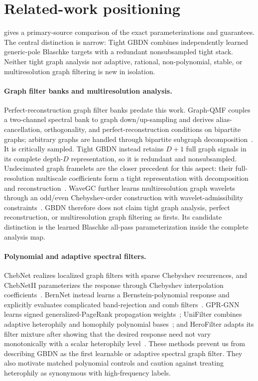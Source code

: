 \section{Related-work positioning}
\label{sec:related-work}

 gives a primary-source comparison of the exact
parameterizations and guarantees.  The central distinction is narrow: Tight
GBDN combines independently learned generic-pole Blaschke targets with a
redundant nonsubsampled tight stack.  Neither tight graph analysis nor adaptive,
rational, non-polynomial, stable, or multiresolution graph filtering is new in
isolation.

\paragraph{Graph filter banks and multiresolution analysis.}
Perfect-reconstruction graph filter banks predate this work. Graph-QMF couples a
two-channel spectral bank to graph down/up-sampling and derives alias-cancellation,
orthogonality, and perfect-reconstruction conditions on bipartite graphs; arbitrary
graphs are handled through bipartite subgraph decomposition~\cite{narang2012graphqmf}.
It is critically sampled. Tight GBDN instead retains $D+1$ full graph signals in its
complete depth-$D$ representation, so it is redundant and nonsubsampled. Undecimated
graph framelets are the closer precedent for this aspect: their full-resolution
multiscale coefficients form a tight representation with decomposition and
reconstruction~\cite{zheng2021framelets}. WaveGC further learns multiresolution graph
wavelets through an odd/even Chebyshev-order construction with wavelet-admissibility
constraints~\cite{liu2025wavegc}. GBDN therefore does not claim tight graph analysis,
perfect reconstruction, or multiresolution graph filtering as firsts. Its candidate
distinction is the learned Blaschke all-pass parameterization inside the complete
analysis map.

\paragraph{Polynomial and adaptive spectral filters.}
ChebNet realizes localized graph filters with sparse Chebyshev recurrences, and
ChebNetII parameterizes the response through Chebyshev interpolation
coefficients~\cite{defferrard2016chebnet,he2022chebnetii}. BernNet instead learns a
Bernstein-polynomial response and explicitly evaluates complicated band-rejection and
comb filters~\cite{he2021bernnet}. GPR-GNN learns signed generalized-PageRank
propagation weights~\cite{chien2021gprgnn}; UniFilter combines adaptive heterophily
and homophily polynomial bases~\cite{huang2024unifilter}; and HeroFilter adapts its
filter mixture after showing that the desired response need not vary monotonically
with a scalar heterophily level~\cite{zhang2025herofilter}. These methods prevent us
from describing GBDN as the first learnable or adaptive spectral graph filter. They
also motivate matched polynomial controls and caution against treating heterophily as
synonymous with high-frequency labels.

